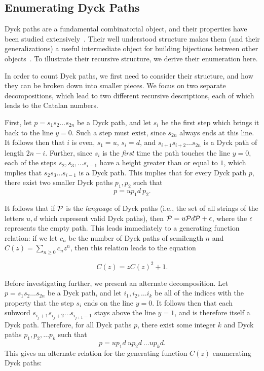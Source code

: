   \subsection{Enumerating Dyck Paths}
    
    
    Dyck paths are a fundamental combinatorial object, and their properties
    have been studied extensively~\cite{Chapman1999, Deutsch1999, Denise1995}. 
    Their well understood structure makes them (and their generalizations) a
    useful intermediate object for building bijections between other
    objects~\cite{Claesson2008, bloomvince}. To illustrate their recursive
    structure, we derive their enumeration here. 

    In order to count Dyck paths, we first need to consider their structure,
    and how they can be broken down into smaller pieces. We focus on two
    separate decompositions, which lead to two different recursive
    descriptions, each of which leads to the Catalan numbers. 

    First, let $p = s_1 s_2 \dots s_{2n}$ be a Dyck path, and let $s_i$ be the
    first step which brings it back to the line $y = 0$. Such a step must
    exist, since $s_{2n}$ always ends at this line. It follows
    then that $i$ is even, $s_1 = u$, $s_i = d$, and $s_{i+1} s_{i+2} \dots
    s_{2n}$ is a Dyck path of length $2n-i$. 
    Further, since $s_i$ is the \emph{first} time
    the path touches the line $y=0$, each of the steps $s_2, s_3, \dots
    s_{i-1}$ have a height greater than or equal to $1$, which implies that
    $s_2 s_3 \dots s_{i-1}$ is a Dyck path. This implies that for every Dyck
    path $p$, there exist two smaller Dyck paths $p_1, p_2$ such that $$ p = u
    p_1 d\ p_2 .$$

    It follows that if $\mathcal{P}$ is the \emph{language} of Dyck paths (i.e., the
    set of all strings of the letters $u,d$ which represent valid Dyck paths),
    then $\mathcal{P} = u \mathcal{P} d \mathcal{P} + \epsilon$, where the $\epsilon$ represents the empty
    path. This leads immediately to a generating function relation: if we let
    $c_n$ be the number of Dyck paths of semilength $n$ and $C(z) = \sum_{n\geq
    0} c_n z^n$, then this relation leads to the equation 

    \begin{equation}  \label{prelim:eqn:firstpass}   
      C(z) = z C(z)^2 + 1. 
    \end{equation}

    Before investigating further, we present an alternate decomposition. Let $p
    = s_1 s_2 \dots s_{2n}$ be a Dyck path, and let $i_1, i_2, \dots i_k$ be
    all of the indices with the property that the step $s_i$ ends on the line
    $y=0$. It follows then that each subword $s_{i_j + 1} s_{i_j + 2} \dots
    s_{i_{j+1} -1}$ stays above the line $y=1$, and is therefore itself a Dyck
    path. Therefore, for all Dyck paths $p$, there exist some integer $k$ and
    Dyck paths $p_1, p_2, \dots p_k$ such that 
    $$ p = u p_1 d\  u p_2 d\  \dots u p_k d.$$
    This gives an alternate relation for the generating function $C(z)$
    enumerating Dyck paths:
    
